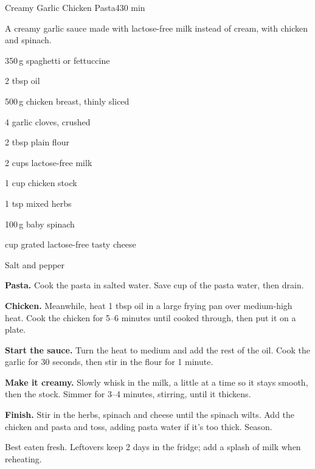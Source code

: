 \begin{recipebox}{Creamy Garlic Chicken Pasta}{4}{30 min}

A creamy garlic sauce made with lactose-free milk instead of cream, with
chicken and spinach.

\begin{ingredients}
  \item 350\,g spaghetti or fettuccine
  \item 2 tbsp oil
  \item 500\,g chicken breast, thinly sliced
  \item 4 garlic cloves, crushed
  \item 2 tbsp plain flour
  \item 2 cups lactose-free milk
  \item 1 cup chicken stock
  \item 1 tsp mixed herbs
  \item 100\,g baby spinach
  \item {} cup grated lactose-free tasty cheese
  \item Salt and pepper
\end{ingredients}

\begin{method}
  \item \textbf{Pasta.} Cook the pasta in salted water. Save  cup of
        the pasta water, then drain.
  \item \textbf{Chicken.} Meanwhile, heat 1 tbsp oil in a large frying pan over
        medium-high heat. Cook the chicken for 5--6 minutes until cooked through,
        then put it on a plate.
  \item \textbf{Start the sauce.} Turn the heat to medium and add the rest of the
        oil. Cook the garlic for 30 seconds, then stir in the flour for 1 minute.
  \item \textbf{Make it creamy.} Slowly whisk in the milk, a little at a time so it
        stays smooth, then the stock. Simmer for 3--4 minutes, stirring, until it
        thickens.
  \item \textbf{Finish.} Stir in the herbs, spinach and cheese until the spinach
        wilts. Add the chicken and pasta and toss, adding pasta water if it's too
        thick. Season.
\end{method}

\begin{notelist}
  \item Best eaten fresh. Leftovers keep 2 days in the fridge; add a splash of
        milk when reheating.
\end{notelist}

\end{recipebox}
